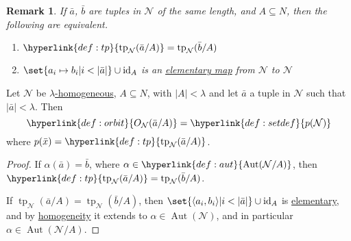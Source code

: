 \documentclass{article}
\let\models\vDash
\DeclareMathOperator{\Aut}{Aut}
\DeclareMathOperator{\tp}{tp}
\newtheorem{nremark}[nthm]{Remark}
\newcommand{\named}[1]{\textbf{#1}\index{#1}}
\begin{document}
\begin{nremark}\label{rem:6.12}
  If $\bar{a}$, $\bar{b}$ are tuples in $\mathcal{N}$ of the same length, and $A\subseteq N$, then the following are equivalent.
  \begin{enumerate}[label=(\roman*)]
    \item $\hyperlink{def:tp}{\tp_{\mathcal{N}}(\bar{a}/A)}= \tp_{\mathcal{N}}(\bar{b}/A)$
    \item $ \set{a_i\mapsto b_i|i < |\bar{a}|}\cup\text{id}_A $ is an \hyperlink{def:el}{elementary map} from $\mathcal{N}$ to $\mathcal{N}$
  \end{enumerate}
\end{nremark}
\begin{nprop}\label{prop:6.13}
  Let $ \mathcal{N} $ be \hyperlink{def:homogeneous}{$\lambda$-homogeneous}, $A\subseteq N$, with $|A|<\lambda$ and let $\bar{a}$ a tuple in $\mathcal{N}$ such that $|\bar{a}|<\lambda$.
  Then
  \begin{equation*}\hyperlink{def:orbit}{O_{\mathcal{N}}(\bar{a}/A)}=\hyperlink{def:setdef}{p(\mathcal{N})}\end{equation*}
  where $p(\bar{x})=\hyperlink{def:tp}{\tp_{\mathcal{N}}(\bar{a}/A)}$.
\end{nprop}
\begin{proof}
  If $\alpha(\bar{a})=\bar{b}$, where $\alpha\in\hyperlink{def:aut}{\Aut(\mathcal{N}/A)}$, then $\hyperlink{def:tp}{\tp_{\mathcal{N}}(\bar{a}/A)}=\tp_{\mathcal{N}}(\bar{b}/A) $.

  If $\tp_{\mathcal{N}}(\bar{a}/A)=\tp_{\mathcal{N}}(\bar{b}/A)$, then $\set{\langle a_i, b_i \rangle | i < |\bar{a}|} \cup \operatorname{id}_A$ is \hyperlink{def:elmap}{elementary}, and by \hyperlink{def:homogeneous}{homogeneity} it extends to $\alpha\in\Aut(\mathcal{N})$, and in particular $\alpha \in \Aut(\mathcal{N}/A)$.
\end{proof}
\end{document}
